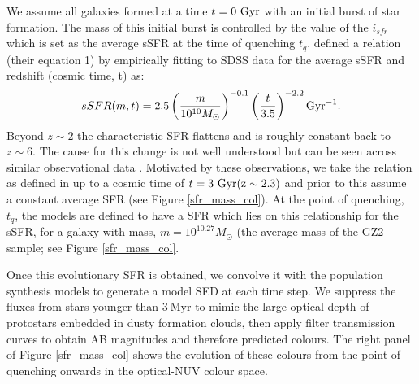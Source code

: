 \documentclass{mn2e}
\begin{document}
We assume all galaxies formed at a time $t=0~\rm{Gyr}$ with an initial burst of star formation. The mass of this initial burst is controlled by the value of the $i_{sfr}$ which is set as the average sSFR at the time of quenching $t_q$. \citet{Peng} defined a relation (their equation 1) by empirically fitting to SDSS data for the average sSFR and redshift (cosmic time, t) as:
\begin{equation}
sSFR(m,t) = 2.5 \left( \frac{m}{10^{10} M_{\odot}} \right)^{-0.1} \left(\frac{t}{3.5}\right)^{-2.2} \rm{Gyr}^{-1}.
\end{equation}
Beyond $z \sim 2$ the characteristic SFR flattens and is roughly constant back to $z\sim6$. The cause for this change is not well understood but can be seen across similar observational data \citep{Peng, Gonzalez, Beth}. Motivated by these observations, we take the relation as defined in \citet{Peng} up to a cosmic time of $t=3~\rm{Gyr} (z \sim 2.3)$ and prior to this assume a constant average SFR (see Figure \ref{sfr_mass_col}). At the point of quenching, $t_{q}$, the models are defined to have a SFR which lies on this relationship for the sSFR, for a galaxy with mass, $m = 10^{10.27} M_{\odot}$ (the average mass of the GZ2 sample; see Figure \ref{sfr_mass_col}.
 

Once this evolutionary SFR is obtained, we convolve it with the \citet{BC03} population synthesis models to generate a model SED at each time step. We suppress the fluxes from stars younger than $3~$Myr to mimic the large optical depth of protostars embedded in dusty formation clouds, then apply filter transmission curves to obtain AB magnitudes and therefore predicted colours. The right panel of Figure \ref{sfr_mass_col} shows the evolution of these colours from the point of quenching onwards in the optical-NUV colour space.
\end{document}
